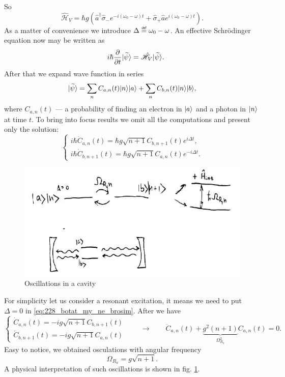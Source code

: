 So
\begin{equation}
	\hat{\mathscr{H}}_V = \hbar g \left( \hat{a}^{\dagger} \hat{\sigma}_- e^{-i (\omega_0 - \omega)t} + \hat{\sigma}_+ \hat{a} e^{i (\omega_0 - \omega)t} \right).
\end{equation}
As a matter of convenience we introduce $\Delta \myeq \omega_0 - \omega$. An effective Schrödinger equation now may be written as
\begin{equation}
	\quad i \hbar \dfrac{\partial {}}{\partial {t}}\lvert\widetilde{\psi}\rangle = \hat{\mathscr{H}}_V \lvert\widetilde{\psi}\rangle.
\end{equation}
After that we expand wave function in series 
\begin{equation}
	\lvert\widetilde{\psi}\rangle = \sum_{n} C_{a,n}(t) \lvert n\rangle \lvert a\rangle + \sum_{n} C_{b,n}(t) \lvert n\rangle \lvert b\rangle,
\end{equation}
where $C_{a,n}(t)$ --- a probability of finding an electron in $\lvert a\rangle$ and a photon in $\lvert n\rangle$ at time $t$. To bring into focus results we omit all the computations and present only the solution:
\begin{equation}
	\begin{cases}
		i \hbar \dot{C}_{a,n}(t) = \hbar g \sqrt{n+1} C_{b,n+1}(t) e^{i \Delta t}, \\
		i \hbar \dot{C}_{b,n+1}(t) = \hbar g \sqrt{n+1} C_{a,n}(t) e^{-i \Delta t}.
	\end{cases}
	\label{eq:228_botat_my_ne_brosim}
\end{equation}

\begin{figure}
	\centering
	\includegraphics[width=0.8\linewidth]{fig/L6/228}
	\caption{Oscillations in a cavity}
	\label{fig:228}
\end{figure}


For simplicity let us consider a resonant excitation, it means we need to put $\Delta  =0$ in \eqref{eq:228_botat_my_ne_brosim}. After we have
\begin{equation}
	\begin{cases}
		\dot{C}_{a,n}(t) = -i g \sqrt{n+1} C_{b,n+1}(t) \\
		\dot{C}_{b,n+1}(t) = -i g \sqrt{n+1} C_{a,n}(t)
	\end{cases} \qquad \to \qquad 
	\ddot{C}_{a,n} (t) + \underbrace{g^2(n+1)}_{\Omega_{R_n}^2} C_{a,n}(t) = 0.
\end{equation}
Easy to notice, we obtained osculations with angular frequency 
\begin{equation}
	\boxed{\Omega_{R_n} = g \sqrt{n+1}.}
\end{equation}
A physical interpretation of such oscillations is shown in fig. \ref{fig:228}.

